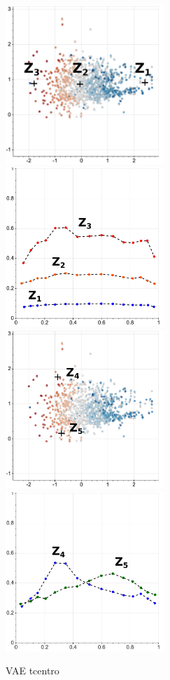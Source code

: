 \begin{figure}
    \centering
    \includegraphics[height=6cm]{img/6_T_Hunch/ls_beta_tcentro_123.png}
    \includegraphics[height=6cm]{img/6_T_Hunch/ls_beta_tcentro_123_gen.png}
    \includegraphics[height=6cm]{img/6_T_Hunch/ls_beta_tcentro_45.png}
    \includegraphics[height=6cm]{img/6_T_Hunch/ls_beta_tcentro_45_gen.png}
    \caption{VAE tcentro}
    \label{fig:my_label}
\end{figure}


